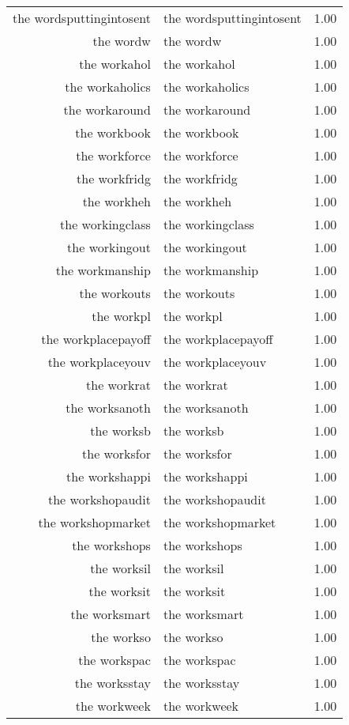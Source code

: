 \begin{table}[ht]
\begin{tabular}{rlr}
  the wordsputtingintosent & the wordsputtingintosent & 1.00 \\ 
  the wordw & the wordw & 1.00 \\ 
  the workahol & the workahol & 1.00 \\ 
  the workaholics & the workaholics & 1.00 \\ 
  the workaround & the workaround & 1.00 \\ 
  the workbook & the workbook & 1.00 \\ 
  the workforce & the workforce & 1.00 \\ 
  the workfridg & the workfridg & 1.00 \\ 
  the workheh & the workheh & 1.00 \\ 
  the workingclass & the workingclass & 1.00 \\ 
  the workingout & the workingout & 1.00 \\ 
  the workmanship & the workmanship & 1.00 \\ 
  the workouts & the workouts & 1.00 \\ 
  the workpl & the workpl & 1.00 \\ 
  the workplacepayoff & the workplacepayoff & 1.00 \\ 
  the workplaceyouv & the workplaceyouv & 1.00 \\ 
  the workrat & the workrat & 1.00 \\ 
  the worksanoth & the worksanoth & 1.00 \\ 
  the worksb & the worksb & 1.00 \\ 
  the worksfor & the worksfor & 1.00 \\ 
  the workshappi & the workshappi & 1.00 \\ 
  the workshopaudit & the workshopaudit & 1.00 \\ 
  the workshopmarket & the workshopmarket & 1.00 \\ 
  the workshops & the workshops & 1.00 \\ 
  the worksil & the worksil & 1.00 \\ 
  the worksit & the worksit & 1.00 \\ 
  the worksmart & the worksmart & 1.00 \\ 
  the workso & the workso & 1.00 \\ 
  the workspac & the workspac & 1.00 \\ 
  the worksstay & the worksstay & 1.00 \\ 
  the workweek & the workweek & 1.00 \\ 

\end{tabular}
\end{table}
